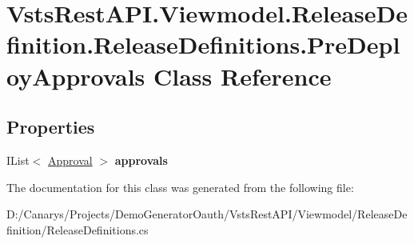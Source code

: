 \hypertarget{class_vsts_rest_a_p_i_1_1_viewmodel_1_1_release_definition_1_1_release_definitions_1_1_pre_deploy_approvals}{}\section{Vsts\+Rest\+A\+P\+I.\+Viewmodel.\+Release\+Definition.\+Release\+Definitions.\+Pre\+Deploy\+Approvals Class Reference}
\label{class_vsts_rest_a_p_i_1_1_viewmodel_1_1_release_definition_1_1_release_definitions_1_1_pre_deploy_approvals}
\subsection*{Properties}
\begin{DoxyCompactItemize}
\item 
\mbox{\label{class_vsts_rest_a_p_i_1_1_viewmodel_1_1_release_definition_1_1_release_definitions_1_1_pre_deploy_approvals_a7d37eb3ab626d01a8805ab3170fc6a74}} 
I\+List$<$ \mbox{\hyperlink{class_vsts_rest_a_p_i_1_1_viewmodel_1_1_release_definition_1_1_release_definitions_1_1_approval}{Approval}} $>$ {\bfseries approvals}
\end{DoxyCompactItemize}


The documentation for this class was generated from the following file\+:\begin{DoxyCompactItemize}
\item 
D\+:/\+Canarys/\+Projects/\+Demo\+Generator\+Oauth/\+Vsts\+Rest\+A\+P\+I/\+Viewmodel/\+Release\+Definition/Release\+Definitions.\+cs\end{DoxyCompactItemize}
